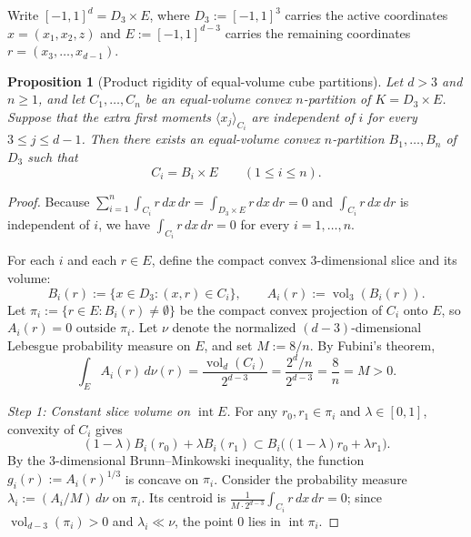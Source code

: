 \documentclass[11pt,a4paper]{amsart}
\numberwithin{equation}{section}
\newtheorem{proposition}[theorem]{Proposition}
\theoremstyle{definition}
\newcommand{\inte}{\operatorname{int}}
\newcommand{\vol}{\operatorname{vol}}
\newcommand{\avg}[2]{\langle #1 \rangle_{#2}}
\begin{document}
Write $[-1,1]^d = D_3 \times E$, where $D_3 := [-1,1]^3$ carries the active coordinates $x = (x_1, x_2, z)$ and $E := [-1,1]^{d-3}$ carries the remaining coordinates $r = (x_3, \dots, x_{d-1})$.

\begin{proposition}[Product rigidity of equal-volume cube partitions]
\label{prop:product-rigidity}
Let $d > 3$ and $n \ge 1$, and let $C_1, \dots, C_n$ be an equal-volume convex $n$-partition of $K = D_3 \times E$. Suppose that the extra first moments $\avg{x_j}{C_i}$ are independent of $i$ for every $3 \le j \le d-1$. Then there exists an equal-volume convex $n$-partition $B_1, \dots, B_n$ of $D_3$ such that
\[
C_i = B_i \times E \qquad (1 \le i \le n).
\]
\end{proposition}

\begin{proof}
Because $\sum_{i=1}^n \int_{C_i} r\, dx\, dr = \int_{D_3 \times E} r\, dx\, dr = 0$ and $\int_{C_i} r\, dx\, dr$ is independent of $i$, we have $\int_{C_i} r\, dx\, dr = 0$ for every $i = 1, \dots, n$.

For each $i$ and each $r \in E$, define the compact convex $3$-dimensional slice and its volume:
\[
B_i(r) := \{x \in D_3 : (x, r) \in C_i\}, \qquad A_i(r) := \vol_3(B_i(r)).
\]
Let $\pi_i := \{r \in E : B_i(r) \ne \emptyset\}$ be the compact convex projection of $C_i$ onto $E$, so $A_i(r) = 0$ outside $\pi_i$. Let $\nu$ denote the normalized $(d-3)$-dimensional Lebesgue probability measure on $E$, and set $M := 8/n$. By Fubini's theorem,
\[
\int_E A_i(r)\, d\nu(r) = \frac{\vol_d(C_i)}{2^{d-3}} = \frac{2^d / n}{2^{d-3}} = \frac{8}{n} = M > 0.
\]

\emph{Step 1: Constant slice volume on $\inte E$.}
For any $r_0, r_1 \in \pi_i$ and $\lambda \in [0,1]$, convexity of $C_i$ gives
\[
(1-\lambda) B_i(r_0) + \lambda B_i(r_1) \subset B_i\bigl((1-\lambda) r_0 + \lambda r_1\bigr).
\]
By the $3$-dimensional Brunn--Minkowski inequality, the function $g_i(r) := A_i(r)^{1/3}$ is concave on $\pi_i$. Consider the probability measure $\lambda_i := (A_i / M)\, d\nu$ on $\pi_i$. Its centroid is $\frac{1}{M \cdot 2^{d-3}} \int_{C_i} r\, dx\, dr = 0$; since $\vol_{d-3}(\pi_i) > 0$ and $\lambda_i \ll \nu$, the point $0$ lies in $\inte \pi_i$.


\end{proof}
\end{document}
